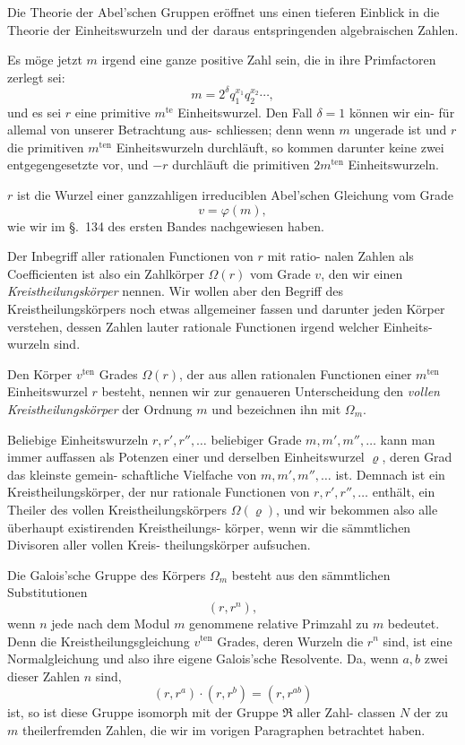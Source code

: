 \documentclass[12pt,a4paper]{article}
\theoremstyle{plain}
\theoremstyle{definition}
\theoremstyle{remark}
\begin{document}
Die Theorie der Abel'schen Gruppen eröffnet uns einen
tieferen Einblick in die Theorie der Einheitswurzeln und der
daraus entspringenden algebraischen Zahlen.

Es möge jetzt $m$ irgend eine ganze positive Zahl sein, die
in ihre Primfactoren zerlegt sei:
\begin{equation}\tag{1}
m = 2^\delta q_1^{x_1} q_2^{x_2} \cdots,
\end{equation}
und es sei $r$ eine primitive $m^{\text{te}}$ Einheitswurzel. Den Fall $\delta = 1$
können wir ein- für allemal von unserer Betrachtung aus-
schliessen; denn wenn $m$ ungerade ist und $r$ die primitiven $m^{\text{ten}}$
Einheitswurzeln durchläuft, so kommen darunter keine zwei
entgegengesetzte vor, und $-r$ durchläuft die primitiven $2m^{\text{ten}}$
Einheitswurzeln.

$r$ ist die Wurzel einer ganzzahligen irreduciblen Abel'schen
Gleichung vom Grade
\begin{equation}\tag{2}
v = \varphi(m),
\end{equation}
wie wir im \S.~134 des ersten Bandes nachgewiesen haben.

Der Inbegriff aller rationalen Functionen von $r$ mit ratio-
nalen Zahlen als Coefficienten ist also ein Zahlkörper $\Omega(r)$ vom
Grade $v$, den wir einen \emph{Kreistheilungskörper} nennen. Wir
wollen aber den Begriff des Kreistheilungskörpers noch etwas
allgemeiner fassen und darunter jeden Körper verstehen, dessen
Zahlen lauter rationale Functionen irgend welcher Einheits-
wurzeln sind.

Den Körper $v^{\text{ten}}$ Grades $\Omega(r)$, der aus allen rationalen
Functionen einer $m^{\text{ten}}$ Einheitswurzel $r$ besteht, nennen wir zur
genaueren Unterscheidung den \emph{vollen Kreistheilungskörper}
der Ordnung $m$ und bezeichnen ihn mit $\Omega_m$.

Beliebige Einheitswurzeln $r, r', r'', \ldots$ beliebiger Grade
$m, m', m'', \ldots$ kann man immer auffassen als Potenzen einer und
derselben Einheitswurzel $\varrho$, deren Grad das kleinste gemein-
schaftliche Vielfache von $m, m', m'', \ldots$ ist. Demnach ist ein
Kreistheilungskörper, der nur rationale Functionen von $r, r', r'', \ldots$
enthält, ein Theiler des vollen Kreistheilungskörpers $\Omega(\varrho)$, und
wir bekommen also alle überhaupt existirenden Kreistheilungs-
körper, wenn wir die sämmtlichen Divisoren aller vollen Kreis-
theilungskörper aufsuchen.

Die Galois'sche Gruppe des Körpers $\Omega_m$ besteht aus den
sämmtlichen Substitutionen
\begin{equation}\tag{3}
(r, r^n),
\end{equation}
wenn $n$ jede nach dem Modul $m$ genommene relative Primzahl
zu $m$ bedeutet. Denn die Kreistheilungsgleichung $v^{\text{ten}}$ Grades,
deren Wurzeln die $r^n$ sind, ist eine Normalgleichung und also
ihre eigene Galois'sche Resolvente. Da, wenn $a, b$ zwei dieser
Zahlen $n$ sind,
\[
(r, r^a) \cdot (r, r^b) = (r, r^{ab})
\]
ist, so ist diese Gruppe isomorph mit der Gruppe $\mathfrak{R}$ aller Zahl-
classen $N$ der zu $m$ theilerfremden Zahlen, die wir im vorigen
Paragraphen betrachtet haben.
\end{document}
